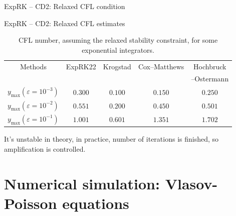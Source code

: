 \documentclass{beamer}
\begin{document}
\begin{frame}{ExpRK -- CD2: Relaxed CFL condition}
{  }
\end{frame}
\begin{frame}{ExpRK -- CD2: Relaxed CFL estimates}
  \begin{table}
    \centering
    \begin{tabular}{|c|c|c|c|c|}
      \hline
      Methods                                & ExpRK22 & Krogstad & Cox--Matthews & Hochbruck \\
                                             &         &          &               & --Ostermann \\
      \hline
      $y_{\max} (\varepsilon=10^{-3})$ & $0.300$ & $0.100$  & $0.150$      & $0.250$ \\
      \hline
      $y_{\max} (\varepsilon=10^{-2})$ & $0.551$ & $0.200$  & $0.450$      & $0.501$ \\
      \hline  
      $y_{\max} (\varepsilon=10^{-1})$ & $1.001$ & $0.601$  & $1.351$      & $1.702$ \\
      \hline  
    \end{tabular}
    \caption{CFL number, assuming the relaxed stability constraint, for some exponential integrators.}
    It's unstable in theory, in practice, number of iterations is finished, so amplification is controlled.
  \end{table}
\end{frame}

\section{Numerical simulation: Vlasov-Poisson equations}
\end{document}
